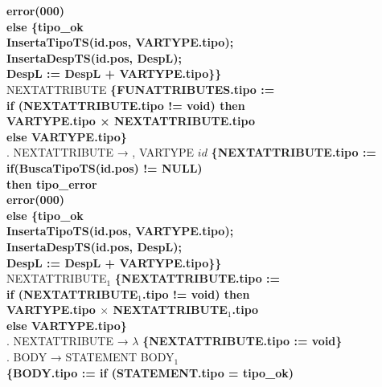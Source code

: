 \begin{tabbing}
    \>              \>          \>
    \>\textbf{error(000)}\\
    \>\>\>\textbf{else \{tipo\_ok}\\
    \>              \>          \>
    \>\textbf{InsertaTipoTS(id.pos, VARTYPE.tipo);}\\
    \>                    \>        \>\>\textbf{InsertaDespTS(id.pos, DespL);}\\
    \>                    \>        \>\>\textbf{DespL := DespL + VARTYPE.tipo\}\}}\\
    \>                    \>NEXTATTRIBUTE \textbf{\{FUNATTRIBUTES.tipo :=}\\
    \>                    \>                      \> \textbf{if (NEXTATTRIBUTE.tipo != void) then}\\
    \>                    \>                      \> \>\textbf{VARTYPE.tipo × NEXTATTRIBUTE.tipo}\\
    \>                    \>                      \> \textbf{else VARTYPE.tipo\}}\\
    . NEXTATTRIBUTE → , VARTYPE $id$ \textbf{\{NEXTATTRIBUTE.tipo :=} \\
    \>\>\>\textbf{if(BuscaTipoTS(id.pos) != NULL)} \\
    \>\>\>\>\textbf{then tipo\_error}\\
    \>\>\>\>\textbf{error(000)}\\
    \>\>\>\textbf{else \{tipo\_ok} \\
    \>\>\>\>\textbf{InsertaTipoTS(id.pos, VARTYPE.tipo);}\\
    \>\>\>\>\textbf{InsertaDespTS(id.pos, DespL);}\\
    \>\>\>\>\textbf{DespL := DespL + VARTYPE.tipo\}\}}\\
    \>                    \>NEXTATTRIBUTE$_1$ \textbf{\{NEXTATTRIBUTE.tipo :=}\\
    \>                    \>                      \> \textbf{if (NEXTATTRIBUTE$_1$.tipo != void) then}\\
    \>                    \>                      \> \>\textbf{VARTYPE.tipo $\times$ NEXTATTRIBUTE$_1$.tipo}\\
    \>                    \>                      \> \textbf{else VARTYPE.tipo\}}\\
    . NEXTATTRIBUTE → $\lambda$ \textbf{\{NEXTATTRIBUTE.tipo := void\}}\\
    . BODY → STATEMENT BODY$_1$\\
    \>                    \>\textbf{\{BODY.tipo := if (STATEMENT.tipo = tipo\_ok)}\\

\end{tabbing}
